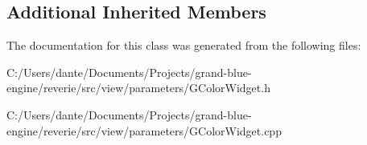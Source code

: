 \subsection*{Additional Inherited Members}


The documentation for this class was generated from the following files\+:\begin{DoxyCompactItemize}
\item 
C\+:/\+Users/dante/\+Documents/\+Projects/grand-\/blue-\/engine/reverie/src/view/parameters/G\+Color\+Widget.\+h\item 
C\+:/\+Users/dante/\+Documents/\+Projects/grand-\/blue-\/engine/reverie/src/view/parameters/G\+Color\+Widget.\+cpp\end{DoxyCompactItemize}
